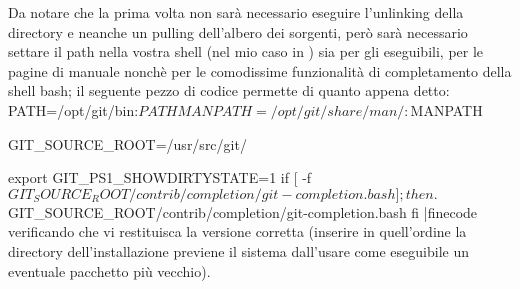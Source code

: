 Da notare che la prima volta non sar\`a necessario eseguire l'unlinking della
directory  e neanche un pulling dell'albero dei sorgenti, per\`o
sar\`a necessario settare il path nella vostra shell (nel mio caso in
) sia per gli eseguibili, per le pagine di manuale nonch\`e per le
comodissime funzionalit\`a di completamento della shell bash; il seguente pezzo
di codice permette di quanto appena detto:
\iniziacode
PATH=/opt/git/bin:$PATH
MANPATH=/opt/git/share/man/:$MANPATH

GIT_SOURCE_ROOT=/usr/src/git/

export GIT_PS1_SHOWDIRTYSTATE=1
if [ -f $GIT_SOURCE_ROOT/contrib/completion/git-completion.bash ];
then
  . $GIT_SOURCE_ROOT/contrib/completion/git-completion.bash
fi
|finecode
verificando che  vi restituisca la versione corretta
(inserire in quell'ordine la directory dell'installazione previene il sistema
dall'usare come eseguibile un eventuale pacchetto pi\`u vecchio).

